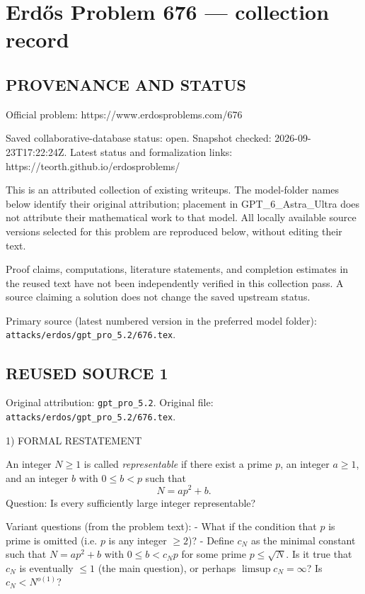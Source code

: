 \section*{Erd\H{o}s Problem 676 --- collection record}

\subsection*{PROVENANCE AND STATUS}
Official problem: https://www.erdosproblems.com/676

Saved collaborative-database status: open.
Snapshot checked: 2026-09-23T17:22:24Z.
Latest status and formalization links: https://teorth.github.io/erdosproblems/

This is an attributed collection of existing writeups. The model-folder names below identify their original attribution; placement in GPT\_6\_Astra\_Ultra does not attribute their mathematical work to that model. All locally available source versions selected for this problem are reproduced below, without editing their text.

Proof claims, computations, literature statements, and completion estimates in the reused text have not been independently verified in this collection pass. A source claiming a solution does not change the saved upstream status.

Primary source (latest numbered version in the preferred model folder): \texttt{attacks/erdos/gpt\_pro\_5.2/676.tex}.

\subsection*{REUSED SOURCE 1}
Original attribution: \texttt{gpt\_pro\_5.2}.
Original file: \texttt{attacks/erdos/gpt\_pro\_5.2/676.tex}.


1) FORMAL RESTATEMENT

An integer $N\ge 1$ is called \emph{representable} if there exist a prime $p$, an integer $a\ge 1$, and an integer $b$ with $0\le b<p$ such that
\[
 N=ap^2+b.
\]
Question: Is every sufficiently large integer representable?

Variant questions (from the problem text):
- What if the condition that $p$ is prime is omitted (i.e. $p$ is any integer $\ge 2$)?
- Define $c_N$ as the minimal constant such that $N=ap^2+b$ with $0\le b<c_N p$ for some prime $p\le\sqrt N$. Is it true that $c_N$ is eventually $\le 1$ (the main question), or perhaps $\limsup c_N=\infty$? Is $c_N<N^{o(1)}$?

